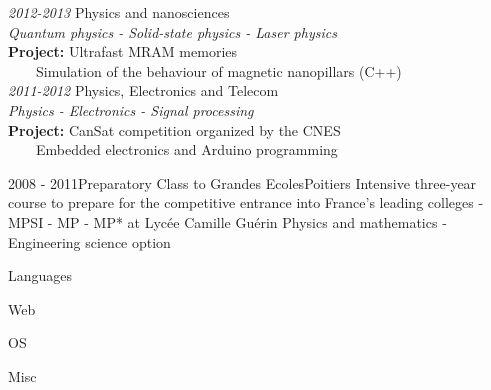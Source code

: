 \documentclass[a4paper]{genard-cv}
\begin{document}
\begin{body}
\begin{entry}
			\textit{2012-2013} Physics and nanosciences\\
			\textit{Quantum physics - Solid-state physics - Laser physics}\\
			\textbf{Project:} Ultrafast MRAM memories\\
			~~~~Simulation of the behaviour of magnetic nanopillars (C++)
			\medskip\\

			\textit{2011-2012} Physics, Electronics and Telecom\\
			\textit{Physics - Electronics - Signal processing}\\
			\textbf{Project:} CanSat competition organized by the CNES\\
			~~~~Embedded electronics and Arduino programming
		\end{entry}
		\begin{entry}
			{2008 - 2011}{Preparatory Class to Grandes Ecoles}{Poitiers}
			{Intensive three-year course to prepare for the competitive entrance
			into France’s leading colleges - MPSI - MP - MP* at Lycée Camille Guérin}
			Physics and mathematics - Engineering science option
		\end{entry}

\end{body}

\begin{aside}

	\begin{about}
	\end{about}\noindent

	\skills
	
	\begin{skillgroup}{Languages}
	\end{skillgroup}

	\begin{skillgroup}{Web}
	\end{skillgroup}

	\begin{skillgroup}{OS}
	\end{skillgroup}

	\begin{skillgroup}{Misc}
	\end{skillgroup}

	\skillscaption
\end{aside}
\end{document}
